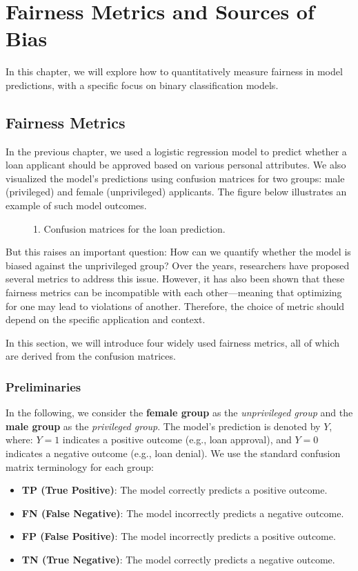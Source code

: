 \section{Fairness Metrics and Sources of Bias}
\par In this chapter, we will explore how to quantitatively measure fairness in model predictions, with a specific focus on binary classification models.  

\subsection{Fairness Metrics}
\par In the previous chapter, we used a logistic regression model to predict whether a loan applicant should be approved based on various personal attributes. We also visualized the model’s predictions using confusion matrices for two groups: male (privileged) and female (unprivileged) applicants. The figure below illustrates an example of such model outcomes.
\begin{figure}
    \caption{1. Confusion matrices for the loan prediction.}
\end{figure}
\par But this raises an important question: How can we quantify whether the model is biased against the unprivileged group? Over the years, researchers have proposed several metrics to address this issue. However, it has also been shown that these fairness metrics can be incompatible with each other—meaning that optimizing for one may lead to violations of another. Therefore, the choice of metric should depend on the specific application and context.
\par In this section, we will introduce four widely used fairness metrics, all of which are derived from the confusion matrices. 

\subsubsection{Preliminaries}
\par In the following, we consider the \textbf{female group} as the \emph{unprivileged group} and the \textbf{male group} as the \emph{privileged group}. The model's prediction is denoted by $Y$, where:  $Y=1$ indicates a positive outcome (e.g., loan approval), and  $Y=0$ indicates a negative outcome (e.g., loan denial). We use the standard confusion matrix terminology for each group:
\begin{itemize}
    \item \textbf{TP (True Positive)}: The model correctly predicts a positive outcome.
    \item \textbf{FN (False Negative)}: The model incorrectly predicts a negative outcome.
    \item \textbf{FP (False Positive)}: The model incorrectly predicts a positive outcome.
    \item \textbf{TN (True Negative)}: The model correctly predicts a negative outcome.
\end{itemize}

